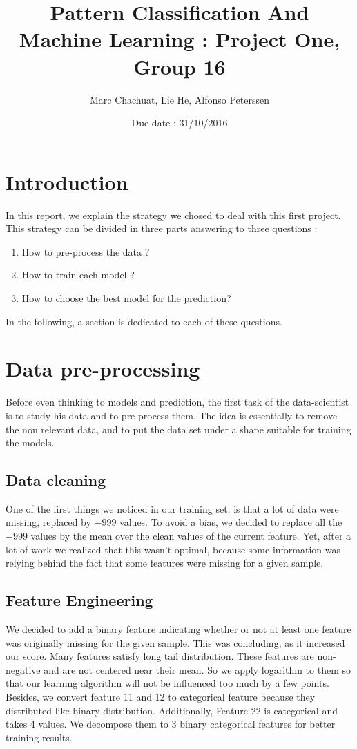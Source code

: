 \documentclass[a4paper, 10pt]{article}
\begin{document}
	
	\title{Pattern Classification And Machine Learning : Project One, Group 16}
	\author{Marc Chachuat, Lie He, Alfonso Peterssen}
	\date{Due date : 31/10/2016} 
	
	\maketitle
	
	\section{Introduction}
	In this report, we explain the strategy we chosed to deal with this first project. This strategy can be divided in three parts answering to three questions : 
	\begin{enumerate}
		\item How to pre-process the data ? 
		\item How to train each model ? 
		\item How to choose the best model for the prediction? 
	\end{enumerate}
	In the following, a section is dedicated to each of these questions. 
	
	\section{Data pre-processing}
	
	Before even thinking to models and prediction, the first task of the data-scientist is to study his data and to pre-process them. The idea is essentially to remove the non relevant data, and to put the data set under a shape suitable for training the models.
	
		\subsection{Data cleaning}
		
		One of the first things we noticed in our training set, is that a lot of data were missing, replaced by $-999$ values. To avoid a bias, we decided to replace all the $-999$ values by the mean over the clean values of the current feature. Yet, after a lot of work we realized that this wasn't optimal, because some information was relying behind the fact that some features were missing for a given sample. \\
		
		\subsection{Feature Engineering}
		We decided to add a binary feature indicating whether or not at least one feature was originally missing for the given sample. This was concluding, as it increased our score.  Many features satisfy long tail distribution. These features are non-negative and are not centered near their mean. So we apply logarithm to them so that our learning algorithm will not be influenced too much by a few points. Besides, we convert feature 11 and 12 to categorical feature because they distributed like binary distribution. Additionally, Feature 22 is categorical and takes 4 values. We decompose them to 3 binary categorical features for better training results.
			
\end{document}
